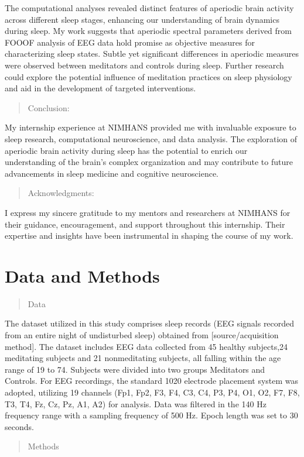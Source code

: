 \documentclass[letterpaper,10pt,english]{sphinxmanual}
\begin{document}
\sphinxAtStartPar
The computational analyses revealed distinct features of aperiodic brain activity across different sleep stages, enhancing our understanding of brain dynamics during sleep. My work suggests that aperiodic spectral parameters derived from FOOOF analysis of EEG data hold promise as objective measures for characterizing sleep states. Subtle yet significant differences in aperiodic measures were observed between meditators and controls during sleep. Further research could explore the potential influence of meditation practices on sleep physiology and aid in the development of targeted interventions.
\begin{quote}

\sphinxAtStartPar
Conclusion:
\end{quote}

\sphinxAtStartPar
My internship experience at NIMHANS provided me with invaluable exposure to sleep research, computational neuroscience, and data analysis. The exploration of aperiodic brain activity during sleep has the potential to enrich our understanding of the brain’s complex organization and may contribute to future advancements in sleep medicine and cognitive neuroscience.
\begin{quote}

\sphinxAtStartPar
Acknowledgments:
\end{quote}

\sphinxAtStartPar
I express my sincere gratitude to my mentors and researchers at NIMHANS for their guidance, encouragement, and support throughout this internship. Their expertise and insights have been instrumental in shaping the course of my work.


\chapter{Data and Methods}
\label{\detokenize{data_method:data-and-methods}}\label{\detokenize{data_method::doc}}\begin{quote}

\sphinxAtStartPar
Data
\end{quote}

\sphinxAtStartPar
The dataset utilized in this study comprises sleep records (EEG signals recorded from an entire night of undisturbed sleep) obtained from {[}source/acquisition method{]}.
The dataset includes EEG data collected from 45 healthy subjects,24 meditating subjects and 21 non\sphinxhyphen{}meditating subjects, all falling within the age range of 19 to 74. Subjects were divided into two groups\sphinxhyphen{} Meditators and Controls.
For EEG recordings, the standard 10\sphinxhyphen{}20 electrode placement system was adopted, utilizing 19 channels (Fp1, Fp2, F3, F4, C3, C4, P3, P4, O1, O2, F7, F8, T3, T4, Fz, Cz, Pz, A1, A2) for analysis. Data was filtered in the 1\sphinxhyphen{}40 Hz frequency range with a sampling frequency of 500 Hz. Epoch length was set to 30 seconds.
\begin{quote}

\sphinxAtStartPar
Methods
\end{quote}
\end{document}
